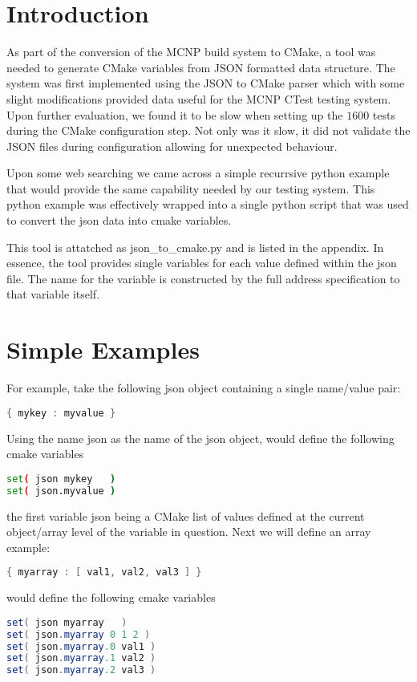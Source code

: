 \documentclass[12pt]{article}
\begin{document}
\section{Introduction}

As part of the conversion of the MCNP build system to CMake, a tool was needed to generate CMake variables
from JSON formatted data structure.  The system was first implemented using the JSON to CMake parser \cite{jsoncmake} which with some slight modifications provided data useful for the MCNP CTest testing system.  Upon further evaluation, we found it to be slow when setting up the $1600$ tests during the CMake configuration step.  Not only was it slow, it did not validate the JSON files during configuration allowing for unexpected behaviour.   

Upon some web searching we came across a simple recurrsive python example that would provide the same capability needed by our testing system\cite{flatten}.  This python example was effectively wrapped into a single python script that was used to convert the json data into cmake variables.

This tool is attatched as json\_to\_cmake.py and is listed in the appendix.  In essence, the tool provides single variables for each value defined within the json file. The name for the variable is constructed by the full address specification to that variable itself.

\section{Simple Examples}
For example, take the following json object containing a single name/value pair:
\begin{lstlisting}[language=java,basicstyle=\tiny,frame=single,columns=fullflexible]
{ mykey : myvalue }
\end{lstlisting}

Using the name json as the name of the json object, would define the following cmake variables
\begin{lstlisting}[language=bash,basicstyle=\tiny,frame=single,columns=fullflexible]
set( json mykey   ) 
set( json.myvalue )
\end{lstlisting}
the first variable json being a CMake list of values defined at the current object/array level of the variable in question.
Next we will define an array example:
\begin{lstlisting}[language=java,basicstyle=\tiny,frame=single,columns=fullflexible]
{ myarray : [ val1, val2, val3 ] }
\end{lstlisting}
would define the following cmake variables
\begin{lstlisting}[language=java,basicstyle=\tiny,frame=single,columns=fullflexible]
set( json myarray   ) 
set( json.myarray 0 1 2 )
set( json.myarray.0 val1 ) 
set( json.myarray.1 val2 ) 
set( json.myarray.2 val3 ) 
\end{lstlisting}
\end{document}
